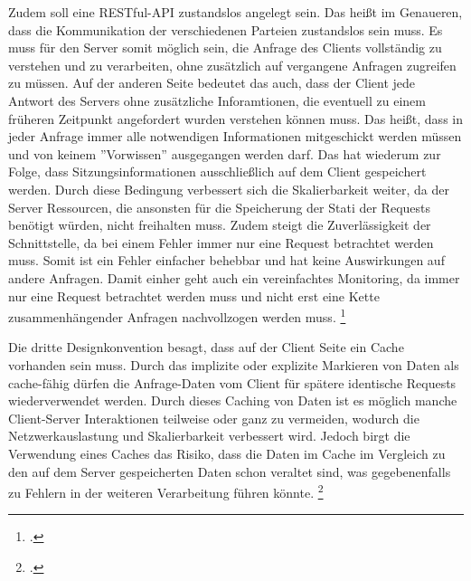 Zudem soll eine RESTful-API zustandslos angelegt sein. Das hei{\ss}t im Genaueren, dass die Kommunikation der verschiedenen Parteien zustandslos sein muss. Es muss für den Server somit möglich sein, die Anfrage des Clients vollständig zu verstehen und zu verarbeiten, ohne zusätzlich auf vergangene Anfragen zugreifen zu müssen. Auf der anderen Seite bedeutet das auch, dass der Client jede Antwort des Servers ohne zusätzliche Inforamtionen, die eventuell zu einem früheren Zeitpunkt angefordert wurden verstehen können muss. Das hei{\ss}t, dass in jeder Anfrage immer alle notwendigen Informationen mitgeschickt werden müssen und von keinem ''Vorwissen'' ausgegangen werden darf. Das hat wiederum zur Folge, dass Sitzungsinformationen ausschlie{\ss}lich auf dem Client gespeichert werden. Durch diese Bedingung verbessert sich die Skalierbarkeit weiter, da der Server Ressourcen, die ansonsten für die Speicherung der Stati der Requests benötigt würden, nicht freihalten muss. Zudem steigt die Zuverlässigkeit der Schnittstelle, da bei einem Fehler immer nur eine Request betrachtet werden muss. Somit ist ein Fehler einfacher behebbar und hat keine Auswirkungen auf andere Anfragen. Damit einher geht auch ein vereinfachtes Monitoring, da immer nur eine Request betrachtet werden muss und nicht erst eine Kette zusammenhängender Anfragen nachvollzogen werden muss. \footcite[Vgl.][]{fielding_architectural_2000}

Die dritte Designkonvention besagt, dass auf der Client Seite ein Cache vorhanden sein muss. Durch das implizite oder explizite Markieren von Daten als cache-fähig dürfen die Anfrage-Daten vom Client für spätere identische Requests wiederverwendet werden. Durch dieses Caching von Daten ist es möglich manche Client-Server Interaktionen teilweise oder ganz zu vermeiden, wodurch die Netzwerkauslastung und Skalierbarkeit verbessert wird. Jedoch birgt die Verwendung eines Caches das Risiko, dass die Daten im Cache im Vergleich zu den auf dem Server gespeicherten Daten schon veraltet sind, was gegebenenfalls zu Fehlern in der weiteren Verarbeitung führen könnte. \footcite[Vgl.][]{fielding_architectural_2000}

